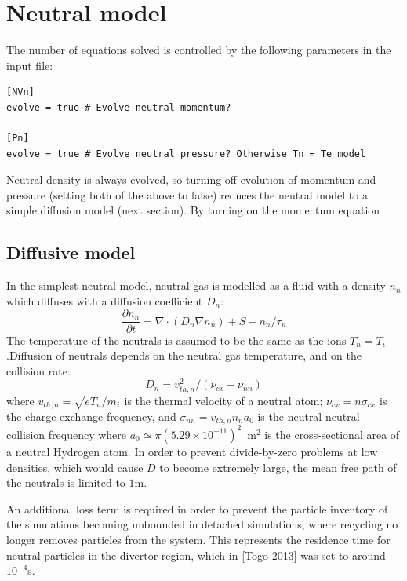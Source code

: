 \documentclass[12pt,a4paper]{article}
\begin{document}
\section{Neutral model}

The number of equations solved is controlled by the following parameters in the input file:
\begin{verbatim}
[NVn]
evolve = true # Evolve neutral momentum?

[Pn]
evolve = true # Evolve neutral pressure? Otherwise Tn = Te model
\end{verbatim}

Neutral density is always evolved, so turning off evolution of momentum and pressure
(setting both of the above to false) reduces the neutral model to a simple diffusion
model (next section). By turning on the momentum equation 

\subsection{Diffusive model}

In the simplest neutral model, neutral gas is modelled as a fluid with a density $n_n$ which diffuses with a diffusion coefficient $D_n$:
\begin{equation}
 \frac{\partial n_n}{\partial t} = \nabla\cdot\left(D_n\nabla n_n\right) + S - n_n / \tau_n
\end{equation}
The temperature of the neutrals is assumed to be the same as the ions
$T_n = T_i$.Diffusion of neutrals depends on the neutral gas temperature, and on the collision rate:
\begin{equation}
D_n = v^2_{th,n} / \left(\nu_{cx} + \nu_{nn}\right)
\end{equation}
where $v_{th,n} = \sqrt{eT_n/m_i}$ is the thermal velocity of a neutral atom; $\nu_{cx} = n\sigma_{cx}$ is the charge-exchange
frequency, and $\sigma_{nn} = v_{th,n} n_n a_0$ is the neutral-neutral collision frequency 
where $a_0 \simeq \pi \left(5.29\times 10^{-11}\right)^2$~m$^2$ is the cross-sectional area of a neutral Hydrogen atom. In order to prevent divide-by-zero problems at low densities, which would cause $D$ to become extremely large,
the mean free path of the neutrals is limited to $1$m. 

An additional loss term is required in order to prevent the particle inventory of the simulations becoming unbounded in detached simulations, where recycling no longer removes particles from the system. This represents the
residence time for neutral particles in the divertor region, which in [Togo 2013] was set to around $10^{-4}$s.
\end{document}
